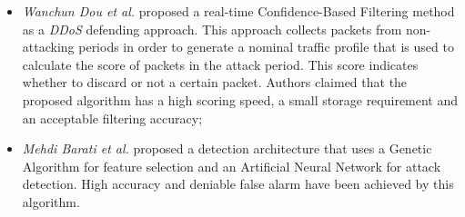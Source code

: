 \begin{itemize}
\item \emph{Wanchun Dou et al.} \cite{dou2013confidence} proposed a real-time Confidence-Based Filtering method as a \emph{DDoS} defending approach. This approach collects packets from non-attacking periods in order to generate a nominal traffic profile that is used to calculate the score of packets in the attack period. This score indicates whether to discard or not a certain packet. Authors claimed that the proposed algorithm has a high scoring speed, a small storage requirement and an acceptable filtering accuracy;
\item \emph{Mehdi Barati et al.} \cite{barati2014distributed} proposed a detection architecture that uses a Genetic Algorithm for feature selection and an Artificial Neural Network for attack detection. High accuracy and deniable false alarm have been achieved by this algorithm. 
\end{itemize}
